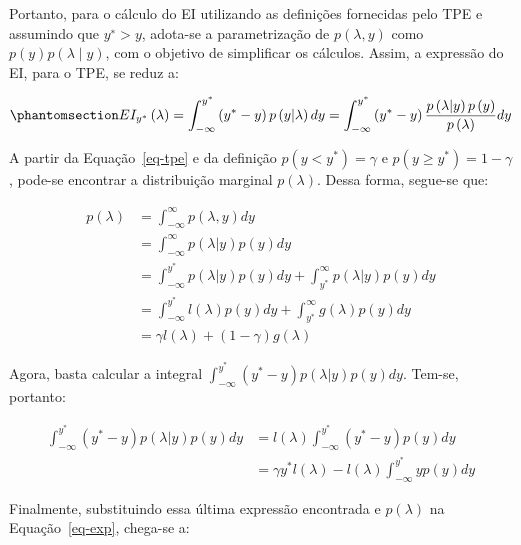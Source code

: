 \documentclass[
  12pt,
  a4paper,
]{scrreprt}
\begin{document}
\vspace{12pt}

Portanto, para o cálculo do EI utilizando as definições fornecidas pelo
TPE e assumindo que \(y^∗>y\), adota-se a parametrização de
\(p\left(\lambda,y\right)\) como
\(p\left(y\right)p\left(\lambda∣y\right)\), com o objetivo de
simplificar os cálculos. Assim, a expressão do EI, para o TPE, se reduz
a:

\begin{equation}\phantomsection\label{eq-exp}{
EI_{y^*}\left(\lambda\right) = \int_{-\infty}^{y^*} \left(y^* - y\right)p\left(y | \lambda\right) dy = \int_{-\infty}^{y^*} \left(y^* - y\right)\frac{p\left(\lambda | y\right) p\left(y \right)}{p\left(\lambda\right)} dy
}\end{equation}

A partir da Equação~\ref{eq-tpe} e da definição
\(p\left(y < y^*\right) = \gamma\) e
\(p\left(y \geq y^*\right) = 1 - \gamma\), pode-se encontrar a
distribuição marginal \(p\left(\lambda\right)\). Dessa forma, segue-se
que:

\[
\begin{aligned}
p\left(\lambda\right) &= \int_{-\infty}^{\infty} p\left(\lambda, y\right) dy \\
&= \int_{-\infty}^{\infty} p\left(\lambda | y\right) p\left(y\right) dy \\
&= \int_{-\infty}^{y^*} p\left(\lambda | y\right) p\left(y\right) dy + \int_{y^*}^{\infty} p\left(\lambda | y\right) p\left(y\right) dy \\
&= \int_{-\infty}^{y^*} l\left(\lambda\right) p\left(y\right) dy + \int_{y^*}^{\infty} g\left(\lambda\right) p\left(y\right) dy \\
&= \gamma l\left(\lambda\right) + \left(1 - \gamma\right) g\left(\lambda\right)
\end{aligned}
\]

Agora, basta calcular a integral
\(\int_{-\infty}^{y^*}\left(y^* - y\right) p\left(\lambda|y\right)p\left(y\right)dy\).
Tem-se, portanto:

\[
\begin{aligned}
\int_{-\infty}^{y^*}\left(y^* - y\right) p\left(\lambda|y\right)p\left(y\right)dy &= l\left(\lambda\right) \int_{-\infty}^{y^*} \left(y^* - y\right) p\left(y\right)dy \\
&= \gamma y^{*} l\left(\lambda\right) - l\left(\lambda\right) \int_{-\infty}^{y^*} y p\left(y\right)dy
\end{aligned}
\]

Finalmente, substituindo essa última expressão encontrada e
\(p\left(\lambda\right)\) na Equação~\ref{eq-exp}, chega-se a:
\end{document}
